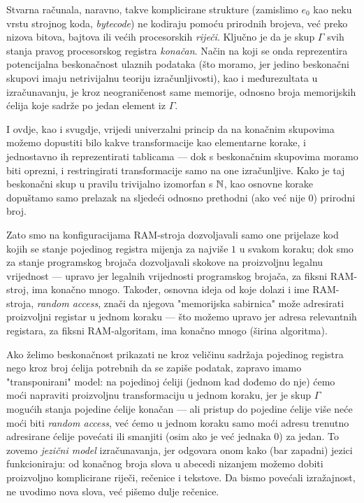 Stvarna računala, naravno, takve komplicirane strukture (zamislimo $e_0$ kao neku vrstu strojnog koda, \emph{bytecode}) ne kodiraju pomoću prirodnih brojeva, već preko nizova bitova, bajtova ili većih procesorskih \emph{riječi}. Ključno je da je skup $\Gamma$ svih stanja pravog procesorskog registra \emph{konačan}. Način na koji se onda reprezentira potencijalna beskonačnost ulaznih podataka (što moramo, jer jedino beskonačni skupovi imaju netrivijalnu teoriju izračunljivosti), kao i međurezultata u izračunavanju, je kroz neograničenost same memorije, odnosno broja memorijskih ćelija koje sadrže po jedan element iz $\Gamma$.

I ovdje, kao i svugdje, vrijedi univerzalni princip da na konačnim skupovima možemo dopustiti bilo kakve transformacije kao elementarne korake, i jednostavno ih reprezentirati tablicama --- dok s beskonačnim skupovima moramo biti oprezni, i restringirati transformacije samo na one izračunljive. Kako je taj beskonačni skup u pravilu trivijalno izomorfan s ${\mathbb N}$, kao osnovne korake dopuštamo samo prelazak na sljedeći odnosno prethodni (ako već nije $0$) prirodni broj.

Zato smo na konfiguracijama RAM-stroja dozvoljavali samo one prijelaze kod kojih se stanje pojedinog registra mijenja za najviše $1$ u svakom koraku; dok smo za stanje programskog brojača dozvoljavali skokove na proizvoljnu legalnu vrijednost --- upravo jer legalnih vrijednosti programskog brojača, za fiksni RAM-stroj, ima konačno mnogo. Također, osnovna ideja od koje dolazi i ime RAM-stroja, \emph{random access}, znači da njegova "memorijska sabirnica" može adresirati proizvoljni registar u jednom koraku --- što možemo upravo jer adresa relevantnih registara, za fiksni RAM-algoritam, ima konačno mnogo (širina algoritma).

Ako želimo beskonačnost prikazati ne kroz veličinu sadržaja pojedinog registra nego kroz broj ćelija potrebnih da se zapiše podatak, zapravo imamo "transponirani" model: na pojedinoj ćeliji (jednom kad dođemo do nje) ćemo moći napraviti proizvoljnu transformaciju u jednom koraku, jer je skup $\Gamma$ mogućih stanja pojedine ćelije konačan --- ali pristup do pojedine ćelije više neće moći biti \emph{random access}, već ćemo u jednom koraku samo moći adresu trenutno adresirane ćelije povećati ili smanjiti (osim ako je već jednaka $0$) za jedan. To zovemo \emph{jezični model} izračunavanja, jer odgovara onom kako (bar zapadni) jezici funkcioniraju: od konačnog broja slova u abecedi nizanjem možemo dobiti proizvoljno komplicirane riječi, rečenice i tekstove. Da bismo povećali izražajnost, ne uvodimo nova slova, već pišemo dulje rečenice.

